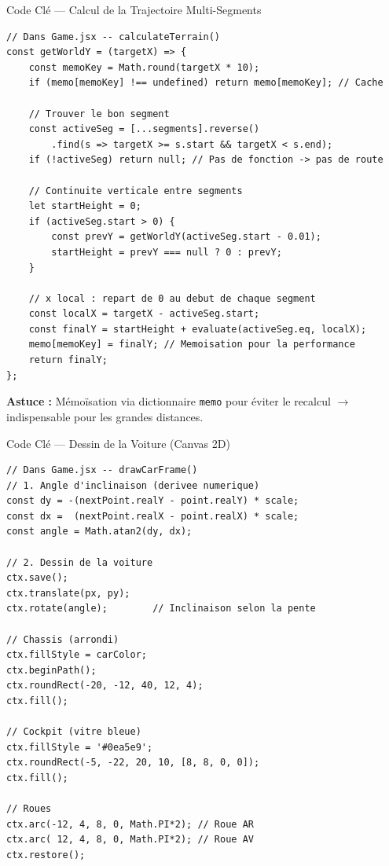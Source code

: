 \documentclass[aspectratio=169,12pt]{beamer}
\begin{document}
\begin{frame}{Code Cl\'e --- Calcul de la Trajectoire Multi-Segments}
\begin{lstlisting}
// Dans Game.jsx -- calculateTerrain()
const getWorldY = (targetX) => {
    const memoKey = Math.round(targetX * 10);
    if (memo[memoKey] !== undefined) return memo[memoKey]; // Cache

    // Trouver le bon segment
    const activeSeg = [...segments].reverse()
        .find(s => targetX >= s.start && targetX < s.end);
    if (!activeSeg) return null; // Pas de fonction -> pas de route

    // Continuite verticale entre segments
    let startHeight = 0;
    if (activeSeg.start > 0) {
        const prevY = getWorldY(activeSeg.start - 0.01);
        startHeight = prevY === null ? 0 : prevY;
    }

    // x local : repart de 0 au debut de chaque segment
    const localX = targetX - activeSeg.start;
    const finalY = startHeight + evaluate(activeSeg.eq, localX);
    memo[memoKey] = finalY; // Memoisation pour la performance
    return finalY;
};
\end{lstlisting}
  \vspace{0.2cm}
  \textcolor{myyellow}{\textbf{Astuce :}} M\'emo\"isation via dictionnaire \texttt{memo} pour \'eviter
  le recalcul $\rightarrow$ indispensable pour les grandes distances.
\end{frame}

\begin{frame}{Code Cl\'e --- Dessin de la Voiture (Canvas 2D)}
\begin{lstlisting}
// Dans Game.jsx -- drawCarFrame()
// 1. Angle d'inclinaison (derivee numerique)
const dy = -(nextPoint.realY - point.realY) * scale;
const dx =  (nextPoint.realX - point.realX) * scale;
const angle = Math.atan2(dy, dx);

// 2. Dessin de la voiture
ctx.save();
ctx.translate(px, py);
ctx.rotate(angle);        // Inclinaison selon la pente

// Chassis (arrondi)
ctx.fillStyle = carColor;
ctx.beginPath();
ctx.roundRect(-20, -12, 40, 12, 4);
ctx.fill();

// Cockpit (vitre bleue)
ctx.fillStyle = '#0ea5e9';
ctx.roundRect(-5, -22, 20, 10, [8, 8, 0, 0]);
ctx.fill();

// Roues
ctx.arc(-12, 4, 8, 0, Math.PI*2); // Roue AR
ctx.arc( 12, 4, 8, 0, Math.PI*2); // Roue AV
ctx.restore();
\end{lstlisting}
\end{frame}
\end{document}
